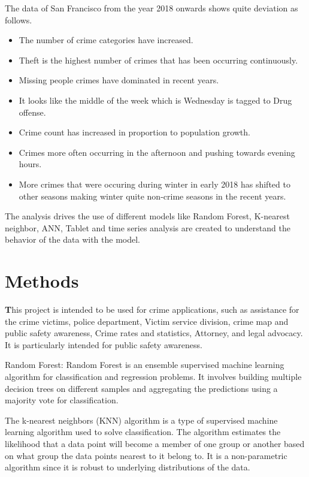 \documentclass[conference,final,]{IEEEtran}
\providecommand{\tightlist}{%
  \setlength{\itemsep}{0pt}\setlength{\parskip}{0pt}}
\begin{document}
The data of San Francisco from the year 2018 onwards shows quite
deviation as follows.

\begin{itemize}
\tightlist
\item
  The number of crime categories have increased.
\item
  Theft is the highest number of crimes that has been occurring
  continuously.
\item
  Missing people crimes have dominated in recent years.
\item
  It looks like the middle of the week which is Wednesday is tagged to
  Drug offense.
\item
  Crime count has increased in proportion to population growth.
\item
  Crimes more often occurring in the afternoon and pushing towards
  evening hours.
\item
  More crimes that were occuring during winter in early 2018 has shifted
  to other seasons making winter quite non-crime seasons in the recent
  years.
\end{itemize}

The analysis drives the use of different models like Random Forest,
K-nearest neighbor, ANN, Tablet and time series analysis are created to
understand the behavior of the data with the model.

\section{Methods}\label{methods}

\textbf This project is intended to be used for
crime applications, such as assistance for the crime victims, police
department, Victim service division, crime map and public safety
awareness, Crime rates and statistics, Attorney, and legal advocacy. It
is particularly intended for public safety awareness.

Random Forest: Random Forest is an ensemble supervised machine learning
algorithm for classification and regression problems. It involves
building multiple decision trees on different samples and aggregating
the predictions using a majority vote for classification.

The k-nearest neighbors (KNN) algorithm is a type of supervised machine
learning algorithm used to solve classification. The algorithm estimates
the likelihood that a data point will become a member of one group or
another based on what group the data points nearest to it belong to. It
is a non-parametric algorithm since it is robust to underlying
distributions of the data.
\end{document}
